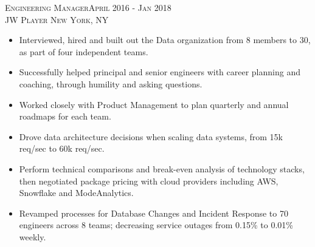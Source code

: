 \begin{comment}
  \textsc{Software Engineer \hfill February 2018 - October 2019\\}
  \textsc{Google \hfill New York, NY\\}
  \textsc{Tech-Lead of Android Advertising}
  \begin{itemize}
    \setlength{\itemsep}{1pt}
    \setlength{\parskip}{0pt}
    \setlength{\parsep}{0pt}
    \setlength{\leftmargin}{-5mm}
  \end{itemize}
\end{comment}
\textsc{Engineering Manager\hfill April 2016 - Jan 2018\\}
\textsc{JW Player \hfill New York, NY\\}
\begin{itemize}
	\setlength{\itemsep}{1pt}
	\setlength{\parskip}{0pt}
	\setlength{\parsep}{0pt}
	\setlength{\leftmargin}{-5mm}
	\item Interviewed, hired and built out the Data organization from 8 members to 30, as part of four independent teams.
	\item Successfully helped principal and senior engineers with career planning and coaching, through humility and asking questions.
	\item Worked closely with Product Management to plan quarterly and annual roadmaps for each team.
	\item Drove data architecture decisions when scaling data systems, from 15k req/sec to 60k req/sec.
	\item Perform technical comparisons and break-even analysis of technology stacks, then negotiated package pricing with cloud providers including AWS, Snowflake and ModeAnalytics.
	\item Revamped processes for Database Changes and Incident Response to 70 engineers across 8 teams; decreasing service outages from 0.15\% to 0.01\% weekly.
\end{itemize}


